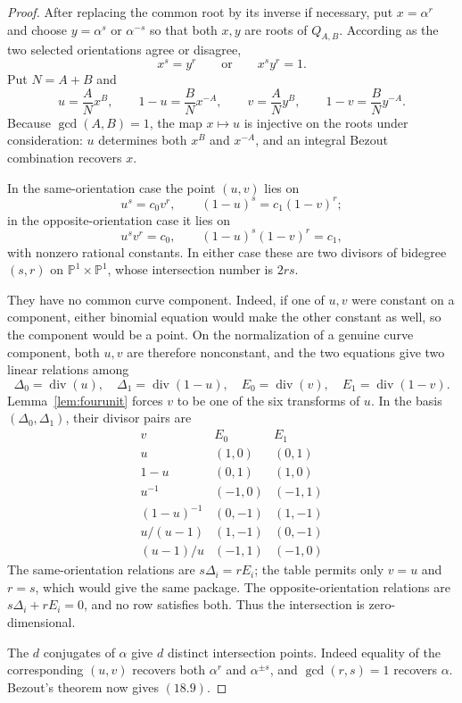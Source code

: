 \documentclass[11pt]{article}
\theoremstyle{definition}
\begin{document}
\begin{proof}
After replacing the common root by its inverse if necessary, put
\(x=\alpha^r\) and choose \(y=\alpha^s\) or \(\alpha^{-s}\) so that both
\(x,y\) are roots of \(Q_{A,B}\).  According as the two selected
orientations agree or disagree,
\[
 x^s=y^r
 \qquad\text{or}\qquad
 x^sy^r=1.
\]
Put \(N=A+B\) and
\[
 u=\frac A N x^B,
 \qquad 1-u=\frac B N x^{-A},
 \qquad
 v=\frac A N y^B,
 \qquad 1-v=\frac B N y^{-A}.
\]
Because \(\gcd(A,B)=1\), the map \(x\mapsto u\) is injective on the roots
under consideration: \(u\) determines both \(x^B\) and \(x^{-A}\), and an
integral Bezout combination recovers \(x\).

In the same-orientation case the point \((u,v)\) lies on
\[
 u^s=c_0v^r,
 \qquad
 (1-u)^s=c_1(1-v)^r;
\]
in the opposite-orientation case it lies on
\[
 u^sv^r=c_0,
 \qquad
 (1-u)^s(1-v)^r=c_1,
\]
with nonzero rational constants.  In either case these are two divisors of
bidegree \((s,r)\) on \(\mathbb P^1\times\mathbb P^1\), whose intersection
number is \(2rs\).

They have no common curve component.  Indeed, if one of \(u,v\) were
constant on a component, either binomial equation would make the other
constant as well, so the component would be a point.  On the normalization
of a genuine curve component, both \(u,v\) are therefore nonconstant, and
the two equations give two
linear relations among
\[
 \Delta_0=\operatorname{div}(u),\quad
 \Delta_1=\operatorname{div}(1-u),\quad
 E_0=\operatorname{div}(v),\quad
 E_1=\operatorname{div}(1-v).
\]
Lemma~\ref{lem:fourunit} forces \(v\) to be one of the six transforms of
\(u\).  In the basis \((\Delta_0,\Delta_1)\), their divisor pairs are
\[
\begin{array}{c|cc}
 v&E_0&E_1\\ \hline
 u&(1,0)&(0,1)\\
 1-u&(0,1)&(1,0)\\
 u^{-1}&(-1,0)&(-1,1)\\
 (1-u)^{-1}&(0,-1)&(1,-1)\\
 u/(u-1)&(1,-1)&(0,-1)\\
 (u-1)/u&(-1,1)&(-1,0)
\end{array}
\]
The same-orientation relations are \(s\Delta_i=rE_i\); the table permits
only \(v=u\) and \(r=s\), which would give the same package.  The
opposite-orientation relations are
\(s\Delta_i+rE_i=0\), and no row satisfies both.  Thus the intersection is
zero-dimensional.

The \(d\) conjugates of \(\alpha\) give \(d\) distinct intersection points.
Indeed equality of the corresponding \((u,v)\) recovers both
\(\alpha^r\) and \(\alpha^{\pm s}\), and \(\gcd(r,s)=1\) recovers
\(\alpha\).  Bezout's theorem now gives \((18.9)\).
\end{proof}
\end{document}
